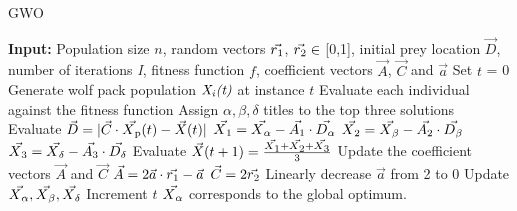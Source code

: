 \documentclass[conference]{IEEEtran}
\begin{document}
\begin{algorithm}[t]
\scriptsize
\caption{GWO}
\label{alg:gwo}
\begin{algorithmic}[1]
\STATE \textbf{Input:} Population size $\textit{n}$, random vectors $\vec{r\textsubscript{1}}$, $\vec{r\textsubscript{2}} \in$ [0,1], initial prey location $\vec{D}$, number of iterations \textit{I}, fitness function $\textit{f}$, coefficient vectors $\vec{A}$, $\vec{C}$ and $\vec{a}$
\STATE Set $\textit{t}$ = 0
\STATE Generate wolf pack population $\textit{X\textsubscript{i}(t)}$ at instance $\textit{t}$
\STATE Evaluate each individual against the fitness function
\ENDFOR
\STATE Assign $\alpha, \beta, \delta$ titles to the top three solutions
\STATE Evaluate $\vec{D} = |\vec{C} \cdot \vec{X\textsubscript{p}}(t) - \vec{X}(t)|$
\STATE $\vec{X\textsubscript{1}} = \vec{X\textsubscript{$\alpha$}} - \vec{A\textsubscript{1}} \cdot  \vec{D\textsubscript{$\alpha$}}$
\STATE $\vec{X\textsubscript{2}} = \vec{X\textsubscript{$\beta$}} - \vec{A\textsubscript{2}} \cdot  \vec{D\textsubscript{$\beta$}}$
\STATE $\vec{X\textsubscript{3}} = \vec{X\textsubscript{$\delta$}} - \vec{A\textsubscript{3}} \cdot  \vec{D\textsubscript{$\delta$}}$
\STATE Evaluate $\vec{X}(t+1) = \frac{\vec{X\textsubscript{1}} + \vec{X\textsubscript{2}} + \vec{X\textsubscript{3}}}{3}$
\ENDFOR
\STATE Update the coefficient vectors $\vec{A}$ and $\vec{C}$
\STATE $\vec{A} = 2\vec{a} \cdot \vec{r\textsubscript{1}} - \vec{a}$
\STATE $\vec{C} = 2\vec{r\textsubscript{2}}$
\STATE Linearly decrease $\vec{a}$ from 2 to 0
\STATE Update $\vec{X\textsubscript{$\alpha$}}, \vec{X\textsubscript{$\beta$}}, \vec{X\textsubscript{$\delta$}}$
\STATE Increment $\textit{t}$
\ENDFOR
\STATE $\vec{X\textsubscript{$\alpha$}}$ corresponds to the global optimum. 
\end{algorithmic}
\end{algorithm}
\end{document}

